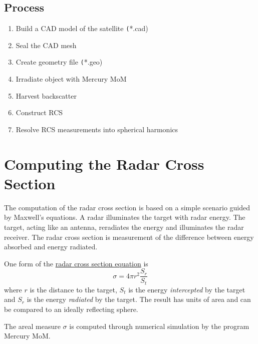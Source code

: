 \subsection{Process}

\begin{enumerate}[label=(\Alph*)]
	\item Build a CAD model of the satellite \texttt(*.cad)
	\item Seal the CAD mesh
	\item Create geometry file \texttt(*.geo)
	\item Irradiate object with Mercury MoM
	\item Harvest backscatter
	\item Construct RCS
	\item Resolve RCS measurements into spherical harmonics
\end{enumerate}

\section{Computing the Radar Cross Section}
The computation of the radar cross section is based on a simple scenario guided by Maxwell's equations. A radar illuminates the target with radar energy. The target, acting like an antenna, reradiates the energy and illuminates the radar receiver. The radar cross section is measurement of the difference between energy absorbed and energy radiated.

One form of the \href{https://www.radartutorial.eu/01.basics/Radar\%20Cross\%20Section.en.html}{radar cross section equation} is
\begin{equation}
	\sigma=4\pi r^{2} \frac{S_{r}}{S_{t}}
\end{equation}
where $r$ is the distance to the target, $S_{t}$ is the energy {\it{intercepted}} by the target and $S_{r}$ is the energy {\it{radiated}} by the target. The result has units of area and can be compared to an ideally reflecting sphere.

The areal measure $\sigma$ is computed through numerical simulation by the program Mercury MoM.

